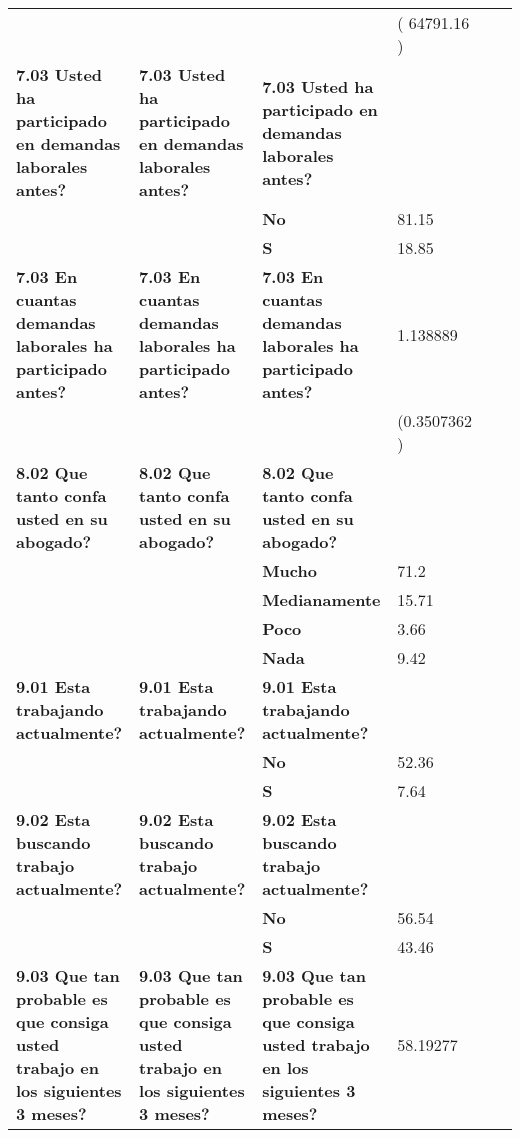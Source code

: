 \begin{longtable}{p{3cm}p{3cm}p{3cm}p{1.5cm}p{1.5cm}p{1.5cm}}
\textbf{ } & \textbf{ } & \textbf{ } & ( 64791.16 ) &       &  \\
\textbf{7.03 Usted ha participado en demandas laborales antes?} & \textbf{7.03 Usted ha participado en demandas laborales antes?} & \textbf{7.03 Usted ha participado en demandas laborales antes?} &       &       &  \\
\textbf{ } & \textbf{ } & \textbf{No} & 81.15 &       &  \\
\textbf{ } & \textbf{ } & \textbf{S} & 18.85 &       &  \\
\textbf{7.03 En cuantas demandas laborales ha participado antes?} & \textbf{7.03 En cuantas demandas laborales ha participado antes?} & \textbf{7.03 En cuantas demandas laborales ha participado antes?} & 1.138889 &       &  \\
\textbf{ } & \textbf{ } & \textbf{} & (0.3507362 ) &       &  \\
\textbf{8.02 Que tanto confa usted en su abogado?} & \textbf{8.02 Que tanto confa usted en su abogado?} & \textbf{8.02 Que tanto confa usted en su abogado?} &       &       &  \\
\textbf{ } & \textbf{ } & \textbf{Mucho          } & 71.2  &       &  \\
\textbf{ } & \textbf{ } & \textbf{Medianamente  } & 15.71 &       &  \\
\textbf{ } & \textbf{ } & \textbf{Poco} & 3.66  &       &  \\
\textbf{ } & \textbf{ } & \textbf{Nada          } & 9.42  &       &  \\
\textbf{9.01 Esta trabajando actualmente?} & \textbf{9.01 Esta trabajando actualmente?} & \textbf{9.01 Esta trabajando actualmente?} &       &       &  \\
\textbf{ } & \textbf{ } & \textbf{No        } & 52.36 &       &  \\
\textbf{ } & \textbf{ } & \textbf{S     } & 7.64  &       &  \\
\textbf{9.02 Esta buscando trabajo actualmente?} & \textbf{9.02 Esta buscando trabajo actualmente?} & \textbf{9.02 Esta buscando trabajo actualmente?} &       &       &  \\
\textbf{ } & \textbf{ } & \textbf{No        } & 56.54 &       &  \\
\textbf{ } & \textbf{ } & \textbf{S       } & 43.46 &       &  \\
\textbf{9.03 Que tan probable es que consiga usted trabajo en los siguientes 3 meses?} & \textbf{9.03 Que tan probable es que consiga usted trabajo en los siguientes 3 meses?} & \textbf{9.03 Que tan probable es que consiga usted trabajo en los siguientes 3 meses?} & 58.19277 &       &  \\

\end{longtable}
